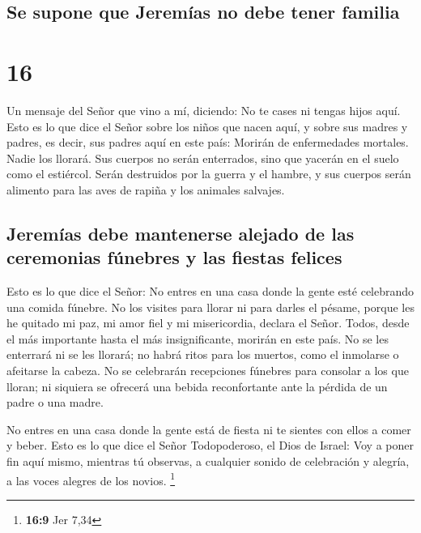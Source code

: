 \hypertarget{se-supone-que-jeremuxedas-no-debe-tener-familia}{%
\subsection{Se supone que Jeremías no debe tener
familia}\label{se-supone-que-jeremuxedas-no-debe-tener-familia}}

\hypertarget{section-15}{%
\section{16}\label{section-15}}

 Un mensaje del Señor que vino a mí, diciendo:
 No te cases ni tengas hijos aquí.  Esto es
lo que dice el Señor sobre los niños que nacen aquí, y sobre sus madres
y padres, es decir, sus padres aquí en este país:  Morirán
de enfermedades mortales. Nadie los llorará. Sus cuerpos no serán
enterrados, sino que yacerán en el suelo como el estiércol. Serán
destruidos por la guerra y el hambre, y sus cuerpos serán alimento para
las aves de rapiña y los animales salvajes.

\hypertarget{jeremuxedas-debe-mantenerse-alejado-de-las-ceremonias-fuxfanebres-y-las-fiestas-felices}{%
\subsection{Jeremías debe mantenerse alejado de las ceremonias fúnebres
y las fiestas
felices}\label{jeremuxedas-debe-mantenerse-alejado-de-las-ceremonias-fuxfanebres-y-las-fiestas-felices}}

 Esto es lo que dice el Señor: No entres en una casa donde
la gente esté celebrando una comida fúnebre. No los visites para llorar
ni para darles el pésame, porque les he quitado mi paz, mi amor fiel y
mi misericordia, declara el Señor.  Todos, desde el más
importante hasta el más insignificante, morirán en este país. No se les
enterrará ni se les llorará; no habrá ritos para los muertos, como el
inmolarse o afeitarse la cabeza.  No se celebrarán
recepciones fúnebres para consolar a los que lloran; ni siquiera se
ofrecerá una bebida reconfortante ante la pérdida de un padre o una
madre.

 No entres en una casa donde la gente está de fiesta ni te
sientes con ellos a comer y beber.  Esto es lo que dice el
Señor Todopoderoso, el Dios de Israel: Voy a poner fin aquí mismo,
mientras tú observas, a cualquier sonido de celebración y alegría, a las
voces alegres de los novios. \footnote{\textbf{16:9} Jer 7,34}

